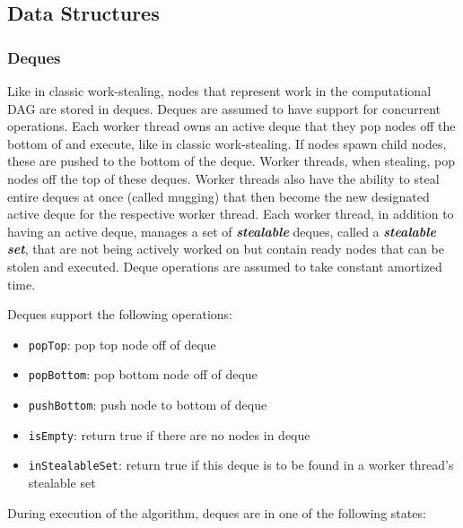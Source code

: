 \documentclass[bsc,frontabs,singlespacing,parskip,deptreport,normalheadings]{infthesis}
\begin{document}
\subsection{Data Structures}

\subsubsection*{Deques}
\label{subsubsection:deques}

Like in classic work-stealing, nodes that represent work in the computational
DAG are stored in deques. Deques are assumed to have support for concurrent
operations. Each worker thread owns an active deque that they pop nodes off the
bottom of and execute, like in classic work-stealing. If nodes spawn child
nodes, these are pushed to the bottom of the deque. Worker threads, when
stealing, pop nodes off the top of these deques. Worker threads also have the
ability to steal entire deques at once (called mugging) that then become the new
designated active deque for the respective worker thread. Each worker thread, in
addition to having an active deque, manages a set of \textbf{\textit{stealable}}
deques, called a \textbf{\textit{stealable set}}, that are not being actively
worked on but contain ready nodes that can be stolen and executed. Deque
operations are assumed to take constant amortized time.

Deques support the following operations:

\begin{itemize}
    \item \texttt{popTop}: pop top node off of deque
    \item \texttt{popBottom}: pop bottom node off of deque
    \item \texttt{pushBottom}: push node to bottom of deque
    \item \texttt{isEmpty}: return true if there are no nodes in deque
    \item \texttt{inStealableSet}: return true if this deque is to be found in a
        worker thread's stealable set
\end{itemize}

During execution of the algorithm, deques are in one of the following states:
\end{document}
